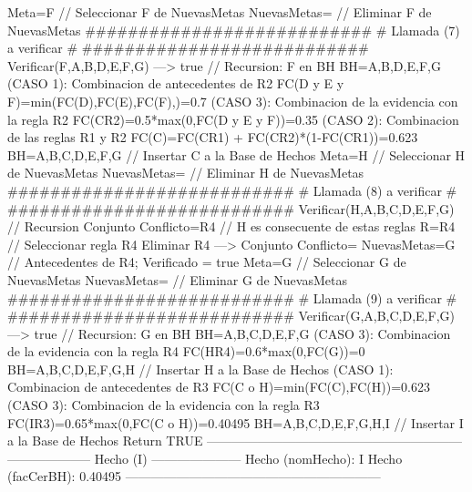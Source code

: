 \begin{listing}[language=Pascal]
		Meta=F // Seleccionar F de NuevasMetas
		NuevasMetas={} // Eliminar F de NuevasMetas
	  ###########################
	  # Llamada (7) a verificar #
	  ###########################
		Verificar(F,{A,B,D,E,F,G}) ---> true // Recursion: F en BH
		BH={A,B,D,E,F,G}
		(CASO 1): Combinacion de antecedentes de R2
		 FC(D y E y F)=min(FC(D),FC(E),FC(F),)=0.7
		(CASO 3): Combinacion de la evidencia con la regla R2
		 FC(C{R2})=0.5*max(0,FC(D y E y F))=0.35
		(CASO 2): Combinacion de las reglas R1 y R2
		 FC(C)=FC(C{R1}) + FC(C{R2})*(1-FC(C{R1}))=0.623
		BH={A,B,C,D,E,F,G} // Insertar C a la Base de Hechos
		Meta=H // Seleccionar H de NuevasMetas
		NuevasMetas={} // Eliminar H de NuevasMetas
	  ###########################
	  # Llamada (8) a verificar #
	  ###########################
		Verificar(H,{A,B,C,D,E,F,G}) // Recursion 
		Conjunto Conflicto={R4} // H es consecuente de estas reglas
		R={R4} // Seleccionar regla R4
		Eliminar R4 ---> Conjunto Conflicto={}
		NuevasMetas={G} // Antecedentes de R4; Verificado = true
		Meta=G // Seleccionar G de NuevasMetas
		NuevasMetas={} // Eliminar G de NuevasMetas
	  ###########################
	  # Llamada (9) a verificar #
	  ###########################
		Verificar(G,{A,B,C,D,E,F,G}) ---> true // Recursion: G en BH
		BH={A,B,C,D,E,F,G}
		(CASO 3): Combinacion de la evidencia con la regla R4
		 FC(H{R4})=0.6*max(0,FC(G))=0
		BH={A,B,C,D,E,F,G,H} // Insertar H a la Base de Hechos
		(CASO 1): Combinacion de antecedentes de R3
		 FC(C o H)=min(FC(C),FC(H))=0.623
		(CASO 3): Combinacion de la evidencia con la regla R3
		 FC(I{R3})=0.65*max(0,FC(C o H))=0.40495
		BH={A,B,C,D,E,F,G,H,I} // Insertar I a la Base de Hechos
	Return TRUE	
------------------------------------------------------------
-------------------- Hecho (I) ---------------------
Hecho (nomHecho): I
Hecho (facCerBH): 0.40495
------------------------------------------------------------
	\end{listing}


	
